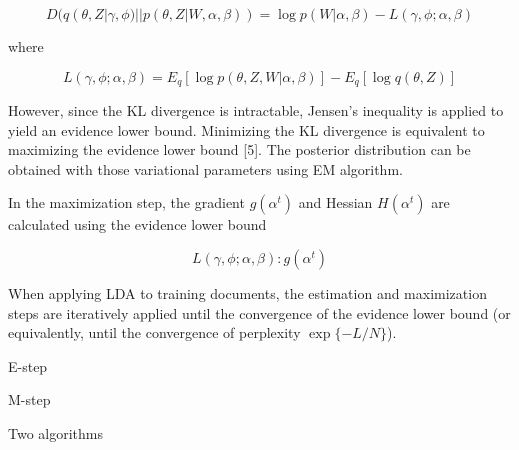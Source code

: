 \documentclass{article} %
\makeatletter
\def\BState{\State\hskip-\ALG@thistlm}
\makeatother
\begin{document}
\begin{equation*}
D(q(\theta,Z|\gamma,\phi)||p(\theta,Z|W,\alpha,\beta)) = \log p(W|\alpha,\beta) - L(\gamma,\phi;\alpha,\beta)
\end{equation*}

where

\begin{equation*}
L(\gamma,\phi;\alpha,\beta) =E_q[\log p(\theta,Z,W|\alpha,\beta)] - E_q[\log q(\theta,Z)]
\end{equation*}

However, since the KL divergence is intractable, Jensen's inequality is applied to yield an evidence lower bound. Minimizing the KL divergence is equivalent to maximizing the evidence lower bound [5]. The posterior distribution can be obtained with those variational parameters using EM algorithm.

In the maximization step, the gradient $g(\alpha^{t})$ and Hessian $H(\alpha^{t})$ are calculated using the evidence lower bound

\begin{equation}
L(\gamma,\phi;\alpha,\beta): g(\alpha^{t})
\end{equation}


When applying LDA to training documents, the estimation and maximization steps are iteratively applied until the convergence of the evidence lower bound (or equivalently, until the convergence of perplexity $\exp\{-L/N\}$).


\begin{table}%
\begin{subalgorithm}{.5\textwidth}
\caption{E-step}\label{algo1}
\end{subalgorithm}%
\begin{subalgorithm}{.5\textwidth}
\caption{M-step}\label{algo2}
\end{subalgorithm}
\captionsetup{labelformat=alglabel}
\caption{Two algorithms}%
\label{tab:1}%
\end{table}
\end{document}
